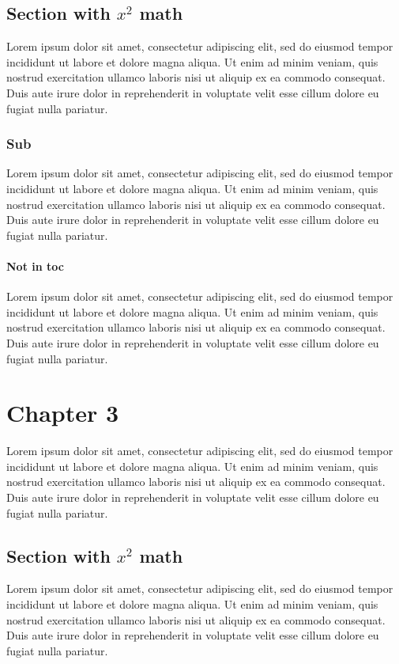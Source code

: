 \documentclass{report}
\begin{document}
\section{Section with $x^2$ math}
Lorem ipsum dolor sit amet, consectetur adipiscing elit, sed do eiusmod tempor incididunt ut labore et dolore magna aliqua. Ut enim ad minim veniam, quis nostrud exercitation ullamco laboris nisi ut aliquip ex ea commodo consequat. Duis aute irure dolor in reprehenderit in voluptate velit esse cillum dolore eu fugiat nulla pariatur.

\subsection{Sub}
Lorem ipsum dolor sit amet, consectetur adipiscing elit, sed do eiusmod tempor incididunt ut labore et dolore magna aliqua. Ut enim ad minim veniam, quis nostrud exercitation ullamco laboris nisi ut aliquip ex ea commodo consequat. Duis aute irure dolor in reprehenderit in voluptate velit esse cillum dolore eu fugiat nulla pariatur.

\subsubsection{Not in toc}
Lorem ipsum dolor sit amet, consectetur adipiscing elit, sed do eiusmod tempor incididunt ut labore et dolore magna aliqua. Ut enim ad minim veniam, quis nostrud exercitation ullamco laboris nisi ut aliquip ex ea commodo consequat. Duis aute irure dolor in reprehenderit in voluptate velit esse cillum dolore eu fugiat nulla pariatur.

\chapter{Chapter 3}
Lorem ipsum dolor sit amet, consectetur adipiscing elit, sed do eiusmod tempor incididunt ut labore et dolore magna aliqua. Ut enim ad minim veniam, quis nostrud exercitation ullamco laboris nisi ut aliquip ex ea commodo consequat. Duis aute irure dolor in reprehenderit in voluptate velit esse cillum dolore eu fugiat nulla pariatur.

\section{Section with $x^2$ math}
Lorem ipsum dolor sit amet, consectetur adipiscing elit, sed do eiusmod tempor incididunt ut labore et dolore magna aliqua. Ut enim ad minim veniam, quis nostrud exercitation ullamco laboris nisi ut aliquip ex ea commodo consequat. Duis aute irure dolor in reprehenderit in voluptate velit esse cillum dolore eu fugiat nulla pariatur.
\end{document}
